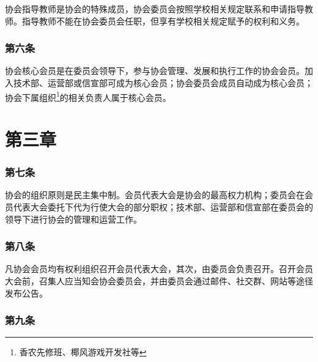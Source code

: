 \documentclass[
]{ctexart}
\begin{document}
协会指导教师是协会的特殊成员，协会委员会按照学校相关规定联系和申请指导教师。指导教师不能在协会委员会任职，但享有学校相关规定赋予的权利和义务。

\hypertarget{ux7b2cux516dux6761-ux6838ux5fc3ux4f1aux5458}{%
\subsubsection{第六条}\label{ux7b2cux516dux6761-ux6838ux5fc3ux4f1aux5458}}

协会核心会员是在委员会领导下，参与协会管理、发展和执行工作的协会会员。加入技术部、运营部或信宣部可成为核心会员；协会委员会成员自动成为核心会员；协会下属组织\footnote{香农先修班、椰风游戏开发社等}的相关负责人属于核心会员。

\hypertarget{ux7b2cux4e09ux7ae0-ux7ec4ux7ec7ux4e0eux7ba1ux7406}{%
\section{第三章}\label{ux7b2cux4e09ux7ae0-ux7ec4ux7ec7ux4e0eux7ba1ux7406}}

\hypertarget{ux7b2cux4e03ux6761-ux7ba1ux7406ux5236ux5ea6}{%
\subsubsection{第七条}\label{ux7b2cux4e03ux6761-ux7ba1ux7406ux5236ux5ea6}}

协会的组织原则是民主集中制。会员代表大会是协会的最高权力机构；委员会在会员代表大会委托下代为行使大会的部分职权；技术部、运营部和信宣部在委员会的领导下进行协会的管理和运营工作。

\hypertarget{ux7b2cux516bux6761-ux4f1aux5458ux4ee3ux8868ux5927ux4f1a}{%
\subsubsection{第八条}\label{ux7b2cux516bux6761-ux4f1aux5458ux4ee3ux8868ux5927ux4f1a}}

凡协会会员均有权利组织召开会员代表大会，其次，由委员会负责召开。召开会员大会前，召集人应当知会协会委员会，并由委员会通过邮件、社交群、网站等途径发布公告。

\hypertarget{ux7b2cux4e5dux6761-ux53ecux5f00ux5927ux4f1aux7684ux8981ux6c42}{%
\subsubsection{第九条}\label{ux7b2cux4e5dux6761-ux53ecux5f00ux5927ux4f1aux7684ux8981ux6c42}}
\end{document}
